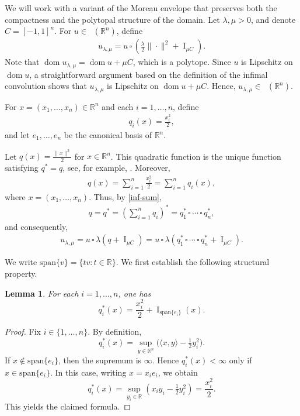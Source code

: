 \documentclass[11pt]{article}
\newtheorem{lema}[teo]{Lemma}
\theoremstyle{definition} %
\newcommand{\RR}{(\mathbb{R}^n)}
\DeclareMathOperator{\I}{I}
\DeclareMathOperator{\dom}{dom}
\DeclareMathOperator{\LP}{Conv_{lp}}
\begin{document}
We will work with a variant of the Moreau envelope that preserves both the compactness and the polytopal structure of the domain. Let $\lambda,\mu>0$, and denote  $C=[-1,1]^n$. 
For $u\in \LP\RR$, define
\begin{align}\label{ulm}
    u_{\lambda,\mu}= u\,\square\, \left(\frac{\lambda}{2}\|\cdot\|^2+\I_{\mu C}\right).
\end{align}
Note that $\dom u_{\lambda,\mu}=\dom u+\mu C$, which is a polytope. Since $u$ is Lipschitz on $\dom u$, a straightforward argument based on the definition of the infimal convolution shows that $u_{\lambda,\mu}$ is Lipschitz on $\dom u+\mu C$. Hence, $u_{\lambda,\mu}\in\LP(\mathbb{R}^n)$.
\medskip


For $x=(x_1,\dots,x_n)\in \mathbb{R}^n$ and each $i=1,\dots,n$, define
\begin{align}\label{q_i}
 q_i(x)=\frac{x_i^2}{2},   
\end{align}
and let $e_1,\dots,e_n$ be the canonical basis of $\mathbb{R}^n$. 

Let $q(x)= \frac{\|x\|^2}{2}$ for $x\in\mathbb{R}^n$. This quadratic function is the unique function satisfying $q^* = q$, see, for example, \cite[Example 11.11]{rockafellar2009variational}. Moreover,
\begin{align*}
 q(x) = \sum_{i=1}^n \frac{x_i^2}{2} =   \sum_{i=1}^n q_i(x), 
\end{align*}
where  $x=(x_1,\dots,x_n)$. Thus, by \eqref{inf-sum},
\begin{align*}
    q= q^*= \left(\sum_{i=1}^n q_i\right)^*= q_1^*\,\square\, \cdots \,\square\, q_n^*,
\end{align*}
and consequently,
\begin{align}\label{ccc}
u_{\lambda,\mu} = u \,\square\, \lambda\left(q+\I_{\mu C}\right)= u\,\square\, \lambda\left(q_1^*\,\square\, \cdots \,\square\, q_n^*+\I_{\mu C}\right).
\end{align}    



We write $\mathrm{span}\{v\}=\{tv:t\in\mathbb{R}\}$.
We first establish the following structural property.

\begin{lema}\label{qi-star}
For each $i=1,\dots,n$, one has
\[
q_i^*(x)=\frac{x_i^2}{2}+\I_{\mathrm{span}\{e_i\}}(x).
\]
\end{lema}


\begin{proof}
Fix $i\in\{1,\dots,n\}$. By definition,
\[
q_i^*(x)=\sup_{y\in\mathbb{R}^n}\bigl(\langle x,y\rangle-\tfrac{1}{2}y_i^2\bigr).
\]
If $x\notin \mathrm{span}\{e_i\}$, then the supremum is $\infty$. Hence $q_i^*(x)<\infty$ only if $x\in \mathrm{span}\{e_i\}$. In this case, writing $x=x_i e_i$, we obtain
\[
q_i^*(x)=\sup_{y_i\in\mathbb{R}}\left(x_i y_i-\tfrac{1}{2}y_i^2\right)=\frac{x_i^2}{2}.
\]
This yields the claimed formula.
\end{proof}
\end{document}

